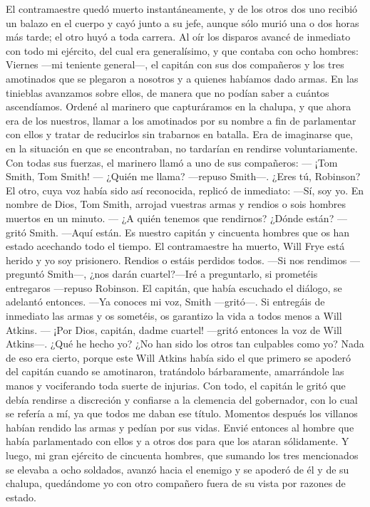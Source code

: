 \documentclass{novela}
\begin{document}
    El contramaestre quedó muerto instantáneamente, y de los otros dos uno recibió un balazo en el cuerpo y cayó junto a su jefe, aunque sólo murió una o dos horas más tarde; el otro huyó a toda carrera.
    Al oír los disparos avancé de inmediato con todo mi ejército, del cual era generalísimo, y que contaba con ocho hombres: Viernes —mi teniente general—, el capitán con sus dos compañeros y los tres amotinados que se plegaron a nosotros y a quienes habíamos dado armas.
    En las tinieblas avanzamos sobre ellos, de manera que no podían saber a cuántos ascendíamos. Ordené al marinero que capturáramos en la chalupa, y que ahora era de los nuestros, llamar a los amotinados por su nombre a fin de parlamentar con ellos y tratar de reducirlos sin trabarnos en batalla. Era de imaginarse que, en la situación en que se encontraban, no tardarían en rendirse voluntariamente.
    Con todas sus fuerzas, el marinero llamó a uno de sus compañeros:
    — ¡Tom Smith, Tom Smith!
    — ¿Quién me llama? —repuso Smith—. ¿Eres tú, Robinson?
    El otro, cuya voz había sido así reconocida, replicó de inmediato:
    —Sí, soy yo. En nombre de Dios, Tom Smith, arrojad vuestras armas y rendios o sois hombres muertos en un minuto.
    — ¿A quién tenemos que rendirnos? ¿Dónde están? —gritó Smith.
    —Aquí están. Es nuestro capitán y cincuenta hombres que os han estado acechando todo el tiempo. El contramaestre ha muerto, Will Frye está herido y yo soy prisionero. Rendios o estáis perdidos todos.
    —Si nos rendimos —preguntó Smith—, ¿nos darán cuartel?—Iré a preguntarlo, si prometéis entregaros —repuso Robinson.
    El capitán, que había escuchado el diálogo, se adelantó entonces.
    —Ya conoces mi voz, Smith —gritó—. Si entregáis de inmediato las armas y os sometéis, os garantizo la vida a todos menos a Will Atkins.
    — ¡Por Dios, capitán, dadme cuartel! —gritó entonces la voz de Will Atkins—. ¿Qué he hecho yo? ¿No han sido los otros tan culpables como yo?
    Nada de eso era cierto, porque este Will Atkins había sido el que primero se apoderó del capitán cuando se amotinaron, tratándolo bárbaramente, amarrándole las manos y vociferando toda suerte de injurias. Con todo, el capitán le gritó que debía rendirse a discreción y confiarse a la clemencia del gobernador, con lo cual se refería a mí, ya que todos me daban ese título.
    Momentos después los villanos habían rendido las armas y pedían por sus vidas. Envié entonces al hombre que había parlamentado con ellos y a otros dos para que los ataran sólidamente. Y luego, mi gran ejército de cincuenta hombres, que sumando los tres mencionados se elevaba a ocho soldados, avanzó hacia el enemigo y se apoderó de él y de su chalupa, quedándome yo con otro compañero fuera de su vista por razones de estado.
\end{document}
